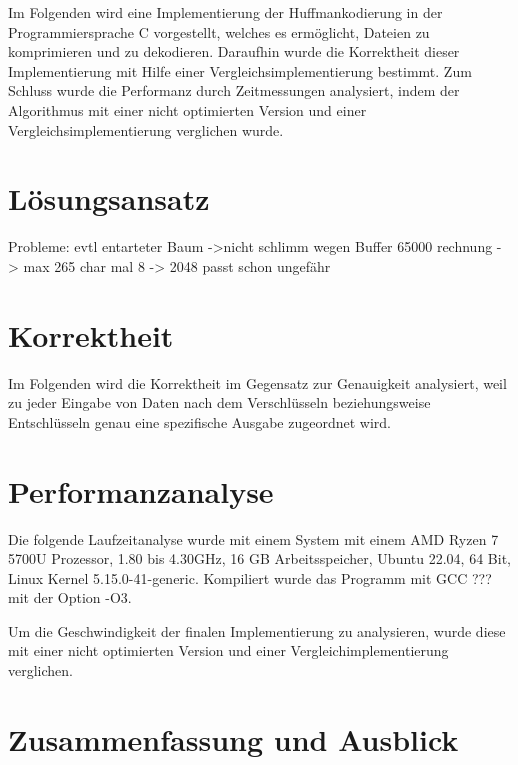 \documentclass[course=erap]{aspdoc}
\begin{document}
Im Folgenden wird eine Implementierung der Huffmankodierung in der Programmiersprache C vorgestellt, welches es ermöglicht, Dateien zu komprimieren und zu dekodieren. Daraufhin wurde die Korrektheit dieser Implementierung mit Hilfe einer Vergleichsimplementierung bestimmt. Zum Schluss wurde die Performanz durch Zeitmessungen analysiert, indem der Algorithmus mit einer nicht optimierten Version und einer Vergleichsimplementierung verglichen wurde.

\section{Lösungsansatz}

Probleme: evtl entarteter Baum ->nicht schlimm wegen Buffer 65000 rechnung -> max 265 char mal 8 -> 2048 passt schon ungefähr


\section{Korrektheit}

Im Folgenden wird die Korrektheit im Gegensatz zur Genauigkeit analysiert, weil zu jeder Eingabe von Daten nach dem Verschlüsseln beziehungsweise Entschlüsseln genau eine spezifische Ausgabe zugeordnet wird.

\section{Performanzanalyse}

Die folgende Laufzeitanalyse wurde mit einem System mit einem AMD Ryzen 7 5700U Prozessor, 1.80 bis 4.30GHz, 16 GB Arbeitsspeicher, Ubuntu 22.04, 64 Bit, Linux Kernel 5.15.0-41-generic. Kompiliert wurde das Programm mit GCC ??? mit der Option -O3.

Um die Geschwindigkeit der finalen Implementierung zu analysieren, wurde diese mit einer nicht optimierten Version und einer Vergleichimplementierung verglichen.

\section{Zusammenfassung und Ausblick}


{}
\end{document}
